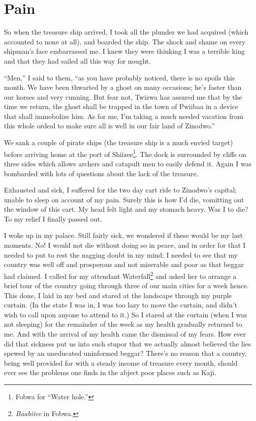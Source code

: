 \chapter{Pain}

So when the treasure ship arrived, I took all the plunder we had acquired (which accounted to none at all), and boarded the ship.
The shock and shame on every shipman's face embarrassed me. I knew they were thinking I was a terrible king and that they had sailed all this way for nought.

``Men,'' I said to them, ``as you have probably noticed, there is no spoils this month. We have been thwarted by a ghost on many occasions; he's faster than our horses and very cunning.
But fear not, Twi\-zwa has assured me that by the time we return, the ghost shall be trapped in the town of Pwiibaa in a device that shall immobolize him.
As for me, I'm taking a much needed vacation from this whole ordeal to make sure all is well in our fair land of Zi\-no\-dwo.''

We sank a couple of pirate ships (the treasure ship is a much envied target) before arriving home at the port of Shiizee\footnote{Fo\-bwa for ``Water hole.''}. The dock is surrounded by cliffs on three sides which allows archers and catapult men to easily defend it. Again I was bombarded with lots of questions about the lack of the treasure.

Exhausted and sick, I suffered for the two day cart ride to Zi\-no\-dwo's capital; unable to sleep on account of my pain. Surely this is how I'd die, vomitting out the window of this cart. My head felt light and my stomach heavy. Was I to die? To my relief I finally passed out.

I woke up in my palace. Still fairly sick, we wondered if these would be my last moments. No! I would not die without doing so in peace, and in order for that I needed to put to rest the nagging doubt in my mind: I needed to see that my country was well off and prosperous and not miserable and poor as that beggar had claimed. I called for my attendant Waterfall\footnote{\emph{Baabiive} in Fobwa.} and asked her to arrange a brief tour of the country going through three of our main cities for a week hence. This done, I laid in my bed and stared at the landscape through my purple curtain. (In the state I was in, I was too lazy to move the curtain, and didn't wish to call upon anyone to attend to it.) So I stared at the curtain (when I was not sleeping) for the remainder of the week as my health gradually returned to me. And with the arrival of my health came the dismissal of my fears. How ever did that sickness put us into such stupor that we actually almost believed the lies spewed by an uneducated uninformed beggar? There's no reason that a country, being well provided for with a steady income of treasure every month, should ever see the problems one finds in the abject poor places such as Ka\-ji.

